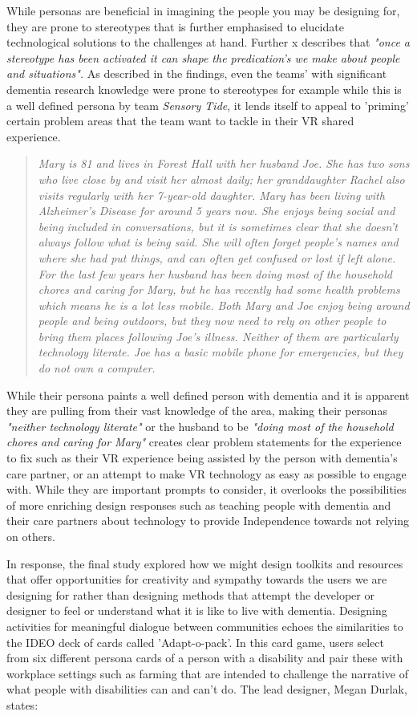 While personas are beneficial in imagining the people you may be designing for, they are prone to stereotypes that is further emphasised to elucidate technological solutions to the challenges at hand. Further x describes that \textit{"once a stereotype has been activated it can shape the predication's we make about people and situations".} As described in the findings, even the teams' with significant dementia research knowledge were prone to stereotypes for example while this is a well defined persona by team \textit{Sensory Tide}, it lends itself to appeal to 'priming' certain problem areas that the team want to tackle in their VR shared experience.
\begin{quote}
\textit{Mary is 81 and lives in Forest Hall with her husband Joe. She has two sons who live close by and visit her almost daily; her granddaughter Rachel also visits regularly with her 7-year-old daughter. Mary has been living with Alzheimer’s Disease for around 5 years now. She enjoys being social and being included in conversations, but it is sometimes clear that she doesn’t always follow what is being said. She will often forget people’s names and where she had put things, and can often get confused or lost if left alone. For the last few years her husband has been doing most of the household chores and caring for Mary, but he has recently had some health problems which means he is a lot less mobile. Both Mary and Joe enjoy being around people and being outdoors, but they now need to rely on other people to bring them places following Joe’s illness. Neither of them are particularly technology literate. Joe has a basic mobile phone for emergencies, but they do not own a computer. }
\end{quote}

While their persona paints a well defined person with dementia and it is apparent they are pulling from their vast knowledge of the area, making their personas \textit{"neither technology literate"} or the husband to be \textit{"doing most of the household chores and caring for Mary"} creates clear problem statements for the experience to fix such as their VR experience being assisted by the person with dementia's care partner, or an attempt to make VR technology as easy as possible to engage with. While they are important prompts to consider, it overlooks the possibilities of more enriching design responses such as teaching people with dementia and their care partners about technology to provide Independence towards not relying on others. 

In response, the final study explored how we might design toolkits and resources that offer opportunities for creativity and sympathy towards the users we are designing for rather than designing methods that attempt the developer or designer to feel or understand what it is like to live with dementia. Designing activities for meaningful dialogue between communities echoes the similarities to the IDEO deck of cards called 'Adapt-o-pack'. In this card game, users select from six different persona cards of a person with a disability and pair these with workplace settings such as farming that are intended to challenge the narrative of what people with disabilities can and can't do. The lead designer, Megan Durlak, states:

